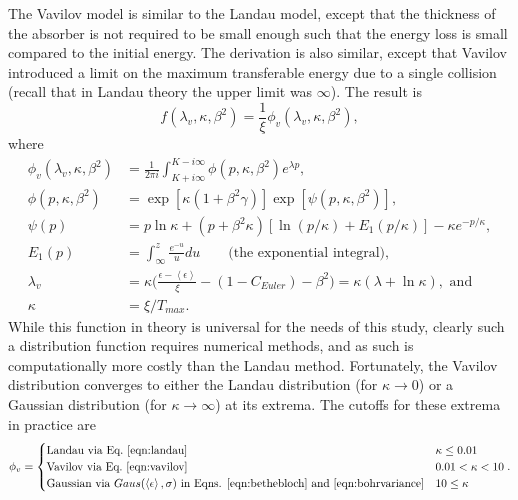 \label{sec:ICOOLVavilov}
The Vavilov model \cite{vavilov} is similar to the Landau model, except that the thickness of the absorber is not required to be small enough such that the energy loss is small compared to the initial energy. The derivation is also similar, except that Vavilov introduced a limit on the maximum transferable energy due to a single collision (recall that in Landau theory the upper limit was $\infty$). The result is
\begin{equation}\label{eqn:vavilov}
f(\lambda_v, \kappa, \beta^2)=\frac{1}{\xi}\phi_v (\lambda_v , \kappa, \beta^2),
\end{equation}
where
\begin{align*}
\phi_v (\lambda_v,\kappa,\beta^2)&=\frac{1}{2\pi i}\int_{K+i\infty} ^{K-i\infty} \phi(p,\kappa,\beta^2) e^{\lambda p},\\
\phi(p,\kappa,\beta^2)&=\exp[\kappa(1+\beta^2 \gamma)]\exp[\psi(p,\kappa,\beta^2)],\\
\psi(p)&=p\ln \kappa + (p+\beta^2\kappa)[\ln(p/\kappa)+E_1 (p/\kappa)]-\kappa e^{-p/\kappa},\\
E_1 (p)&= \int_\infty ^z \frac{e^{-u}}{u} du \qquad \text{(the exponential integral)},\\
\lambda_v &= \kappa\Big(\frac{\epsilon-\left<\epsilon\right>}{\xi}-(1-C_{Euler})-\beta^2\Big)= \kappa(\lambda+\ln\kappa),\text{ and}\\
\kappa&=\xi/T_{max}.
\end{align*}
While this function in theory is universal for the needs of this study, clearly such a distribution function requires numerical methods, and as such is computationally more costly than the Landau method. Fortunately, the Vavilov distribution converges to either the Landau distribution (for $\kappa\rightarrow 0$) or a Gaussian distribution (for $\kappa\rightarrow\infty$) at its extrema. The cutoffs for these extrema in practice are
\begin{align*}
\phi_v=
	\begin{cases}
	\text{Landau via Eq.~\eqref{eqn:landau}} & \kappa\leq 0.01\\
	\text{Vavilov via Eq.~\eqref{eqn:vavilov}} & 0.01 < \kappa < 10\\
	\text{Gaussian via }Gaus(\left<\epsilon\right>,\sigma)\text{ in Eqns. \ref{eqn:bethebloch} and \ref{eqn:bohrvariance}} & 10\leq\kappa
	\end{cases}.
\end{align*}

